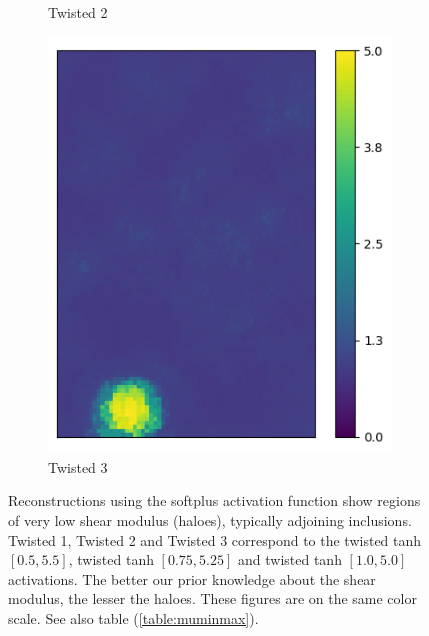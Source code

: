 \documentclass[12pt]{article}
\newcommand{\nhghaloesheight}{3.0cm}
\newcommand{\nhghaloeswidth}{0.19\linewidth}
\begin{document}
\begin{figure}[!h]
\begin{subfigure}[c]{\nhghaloeswidth}
    \caption{\label{fig:haloes_tanhp25} Twisted 2}        
  \end{subfigure}
  \begin{subfigure}[c]{\nhghaloeswidth}
    \centering
    \includegraphics[totalheight=\nhghaloesheight]{Figures/softplus_halos/ex1/mutanhshift0.png}
    \caption{\label{fig:haloes_tanhp0} Twisted 3}    
  \end{subfigure}     
  \caption{\label{fig:haloes} Reconstructions using the softplus activation function show regions of very low shear modulus (haloes), typically adjoining inclusions. Twisted 1, Twisted 2 and Twisted 3 correspond to the twisted tanh $[0.5, 5.5]$, twisted tanh $[0.75,5.25]$ and twisted tanh $[1.0,5.0]$ activations. The better our prior knowledge about the shear modulus, the lesser the haloes. These figures are on the same color scale. See also table (\ref{table:muminmax}).}
\end{figure}
%
\end{document}
